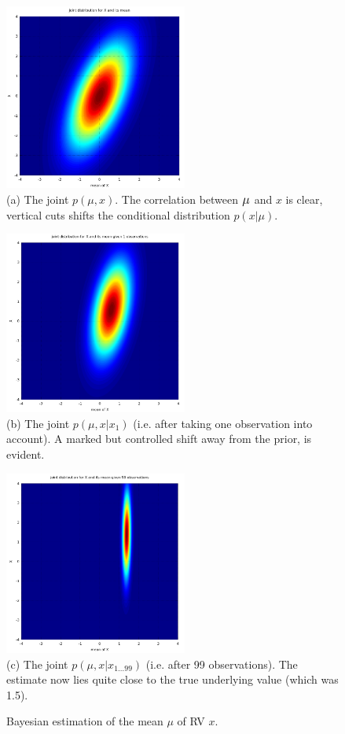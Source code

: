 \begin{figure}
  \begin{centering}
  \includegraphics[width=6cm]{bayesmean0}\\
  (a) The joint $p(\mu,x)$. The correlation between $\mbox{\large$\mu$}$ and $x$ is
  clear, vertical cuts shifts the conditional distribution $p(x|\mu)$.
  \end{centering}

  \begin{centering}
  \includegraphics[width=6cm]{bayesmean1}\\
  (b) The joint $p(\mu,x|x_{1})$ (i.e. after taking one observation into
  account). A marked but controlled shift away from the prior, is evident.
  \end{centering}

  \begin{centering}
  \includegraphics[width=6cm]{bayesmean99}\\
  (c) The joint $p(\mu,x|x_{1\ldots99})$ (i.e. after 99 observations).
  The estimate now lies quite close to the true underlying value (which
  was 1.5).
  \end{centering}

\caption{Bayesian estimation of the mean $\mu$ of RV $x$.}
\label{fig:bayesmeanest}
\end{figure}


